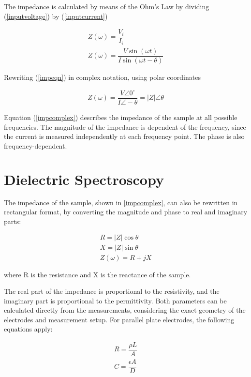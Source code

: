 \documentclass[10pt,b5paper,oneside]{book}
\begin{document}
The impedance is calculated by means of the Ohm's Law by dividing (\ref{inputvoltage}) by (\ref{inputcurrent})

\begin{align}
Z(\omega) = \dfrac{V_i}{I_i} \\
Z(\omega) = \dfrac{V \sin(\omega t)}{I \sin(\omega t - \theta)} \label{impeqn}
\end{align}

Rewriting (\ref{impeqn}) in complex notation, using polar coordinates

\begin{align}
Z(\omega) = \dfrac{V \angle 0^{\circ}}{I \angle -\theta} = |Z| \angle \theta \label{impcomplex}
\end{align}

Equation (\ref{impcomplex}) describes the impedance of the sample at all possible frequencies. The magnitude of the impedance is dependent of the frequency, since the current is measured independently at each frequency point. The phase is also frequency-dependent.



\section{Dielectric Spectroscopy}

The impedance of the sample, shown in \eqref{impcomplex}, can also be rewritten in rectangular format, by converting the magnitude and phase to real and imaginary parts:

\begin{align}
	R=|Z|\cos{\theta} \\
	X=|Z|\sin{\theta} \\
	Z(\omega) = R + jX \label{impedance}
\end{align}

where R is the resistance and X is the reactance of the sample.

The real part of the impedance is proportional to the resistivity, and the imaginary part is proportional to the permittivity. Both parameters can be calculated directly from the measurements, considering the exact geometry of the electrodes and measurement setup. For parallel plate electrodes, the following equations apply:

\begin{align}
R = \dfrac{\rho L}{A} \label{resistance} \\
C = \dfrac{\epsilon A}{D} \label{capacitance}
\end{align}
\end{document}
